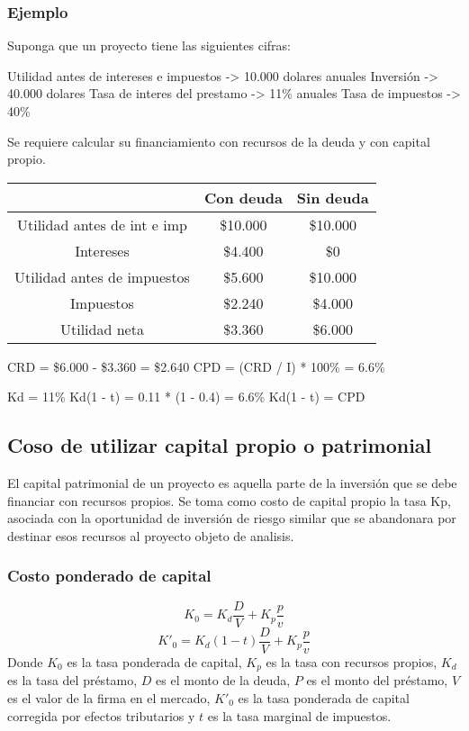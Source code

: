 \documentclass[a4paper, 11pt, oneside]{article}
\begin{document}
\subsubsection{Ejemplo}

Suponga que un proyecto tiene las siguientes cifras:

Utilidad antes de intereses e impuestos -> 10.000 dolares anuales
Inversión -> 40.000 dolares
Tasa de interes del prestamo -> 11\% anuales
Tasa de impuestos -> 40\%

Se requiere calcular su financiamiento con recursos de la deuda y con capital propio.

\begin{table}
\begin{tabular}{ |c|c|c| }
\hline
                                &   Con deuda          &           Sin deuda \\
\hline
Utilidad antes de int e imp     &  \$10.000            &           \$10.000\\
Intereses		 	&   \$4.400            &                \$0\\
Utilidad antes de impuestos     &   \$5.600            &           \$10.000\\
Impuestos			&   \$2.240            &            \$4.000\\
Utilidad neta			&   \$3.360            &            \$6.000\\
\hline
\end{tabular}
\end{table}

CRD = \$6.000 - \$3.360 = \$2.640
CPD = (CRD / I) * 100\% = 6.6\%

Kd = 11\%
Kd(1 - t) = 0.11 * (1 - 0.4) = 6.6\%
Kd(1 - t) = CPD

\subsection{Coso de utilizar capital propio o patrimonial}

El capital patrimonial de un proyecto es aquella parte de la inversión que se debe financiar con recursos propios. Se toma como costo de capital propio
la tasa Kp, asociada con la oportunidad de inversión de riesgo similar que se abandonara por destinar esos recursos al proyecto objeto de analisis.

\subsubsection{Costo ponderado de capital}
\[ K_0 = K_d\frac{D}{V}+K_p\frac{p}{v} \]
\[ K'_0 = K_d(1-t)\frac{D}{V}+K_p\frac{p}{v} \]
Donde $K_0$ es la tasa ponderada de capital, $K_p$ es la tasa con recursos propios, $K_d$ es la tasa del préstamo, $D$ es el monto de la deuda, $P$ es el monto del préstamo, $V$ es el valor de la firma en el mercado, $K'_0$ es la tasa ponderada de capital corregida por efectos tributarios y $t$ es la tasa marginal de impuestos.
\end{document}
